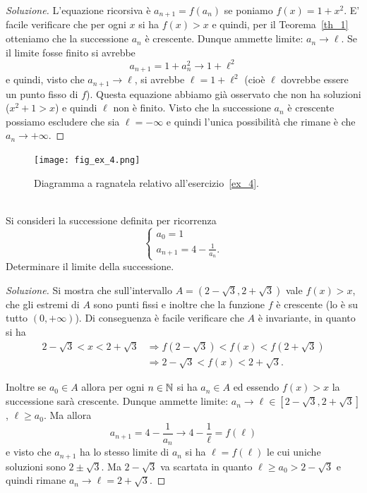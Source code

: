 \begin{proof}[Soluzione]
  L'equazione ricorsiva è $a_{n+1}=f(a_n)$ se poniamo $f(x) = 1+x^2$.
  E' facile verificare che per ogni $x$ si ha $f(x) > x$ e quindi, per
  il Teorema~\ref{th_1} otteniamo che la successione $a_n$ è
  crescente. Dunque ammette limite: $a_n \to \ell$. Se il limite fosse
  finito si avrebbe
  \[
  a_{n+1} = 1 + a_n^2 \to 1 + \ell^2
  \]
  e quindi, visto che $a_{n+1}\to \ell$, si avrebbe $\ell = 1 +
  \ell^2$ (cioè $\ell$ dovrebbe essere un punto fisso di $f$). Questa
  equazione abbiamo già osservato che non ha soluzioni ($x^2 + 1 > x$)
  e quindi $\ell$ non è finito. Visto che la successione $a_n$ è
  crescente possiamo escludere che sia $\ell=-\infty$ e quindi l'unica
  possibilità che rimane è che $a_n \to +\infty$.
\end{proof}

\newsavebox{\qrexquattro}
\begin{figure}
  \begin{center}
  \texttt{[image: fig\_ex\_4.png]}
  \end{center}
  \caption{Diagramma a ragnatela relativo
    all'esercizio~\ref{ex_4}.
    \ifwidemargin\\\\\fi%
    \usebox{\qrexquattro}
    }
  \label{fig_ex_4}
\end{figure}

\begin{exercise}\label{ex_4}
  Si consideri la successione definita per ricorrenza
  \[
  \begin{cases}
    a_0 = 1\\
    a_{n+1} =4-\frac 1 {a_n}.
  \end{cases}
  \]
  Determinare il limite della successione.
\end{exercise}

\begin{proof}[Soluzione]
  Si mostra che sull'intervallo $A=(2-\sqrt 3, 2+\sqrt 3)$
  vale $f(x)>x$, che gli estremi di $A$ sono punti fissi
  e inoltre che la funzione $f$ è crescente (lo è su tutto $(0,+\infty)$).
  Di conseguenza è facile verificare che $A$ è invariante, in quanto si ha
  \begin{align*}
  2-\sqrt 3 < x < 2+\sqrt 3 &\Rightarrow
  f(2-\sqrt 3) < f(x) < f(2+\sqrt 3)\\
  &\Rightarrow
  2-\sqrt 3 < f(x) < 2+\sqrt 3.
  \end{align*}

  Inoltre se $a_0 \in A$ allora per ogni $n\in{\mathbb N}$ si ha $a_n\in A$ ed essendo
  $f(x)>x$ la successione sarà crescente. Dunque ammette
  limite: $a_n \to \ell \in [2-\sqrt 3,2+\sqrt 3]$, $\ell \ge a_0$.
  Ma allora
  \[
  a_{n+1} = 4-\frac 1 {a_n} \to 4 - \frac 1 \ell = f(\ell)
  \]
  e visto che $a_{n+1}$ ha lo stesso limite di $a_n$ si ha $\ell =
  f(\ell)$ le cui uniche soluzioni sono $2\pm \sqrt 3$. Ma $2-\sqrt 3$
  va scartata in quanto $\ell\ge a_0 > 2-\sqrt 3$ e quindi rimane
  $a_n \to \ell = 2+\sqrt 3$.
\end{proof}


